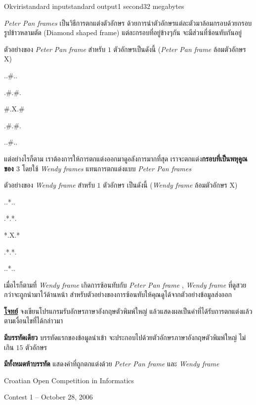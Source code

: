 \documentclass[11pt,a4paper]{article}
\begin{document}
\begin{problem}{Okviri}{standard input}{standard output}{1 second}{32 megabytes}

\textit{Peter Pan frames} เป็นวิธีการตกแต่งตัวอักษร ด้วยการนำตัวอักษรแต่ละตัวมาล้อมกรอบด้วยกรอบรูปข้าวหลามตัด (Diamond shaped frame) แต่ละกรอบที่อยู่ข้างๆกัน จะมีส่วนที่ซ้อนทับกันอยู่

ตัวอย่างของ \textit{Peter Pan frame} สำหรับ $1$ ตัวอักษรเป็นดังนี้ (\textit{Peter Pan frame} ล้อมตัวอักษร X)

..\#..

.\#.\#.

\#.X.\#

.\#.\#.

..\#..

แต่อย่างไรก็ตาม เราต้องการให้การตกแต่งออกมาดูอลังการมากที่สุด เราจะตกแต่ง\textbf{กรอบที่เป็นพหุคูณของ $3$} โดยใช้ \textit{Wendy frames} แทนการตกแต่งแบบ \textit{Peter Pan frames}

ตัวอย่างของ \textit{Wendy frame} สำหรับ $1$ ตัวอักษร เป็นดังนี้ (\textit{Wendy frame }ล้อมตัวอักษร X)

..*..

.*.*.

*.X.*

.*.*.

..*..


เมื่อไรก็ตามที่ \textit{Wendy frame} เกิดการซ้อนทับกับ \textit{Peter Pan frame} , \textit{Wendy frame} ที่ดูสวยกว่าจะถูกนำมาไว้ด้านหน้า สำหรับตัวอย่างของการซ้อนทับให้คุณดูได้จากตัวอย่างข้อมูลส่งออก


\underline{\textbf{โจทย์}} จงเขียนโปรแกรมรับอักษรภาษาอังกฤษตัวพิมพ์ใหญ่ แล้วแสดงผลเป็นคำที่ได้รับการตกแต่งแล้วตามเงื่อนไขที่ได้กล่าวมา

\InputFile

\textbf{มีบรรทัดเดียว} บรรทัดแรกของข้อมูลนำเข้า จะประกอบไปด้วยตัวอักษรภาษาอังกฤษตัวพิมพ์ใหญ่ ไม่เกิน $15$ ตัวอักษร

\OutputFile

\textbf{มีทั้งหมดห้าบรรทัด} แสดงคำที่ถูกตกแต่งด้วย \textit{Peter Pan frame} และ \textit{Wendy frame}

\Examples

\begin{example}
%
%
%
\end{example}

\Source

Croatian Open Competition in Informatics

Contest 1 – October 28, 2006

\end{problem}
\end{document}
